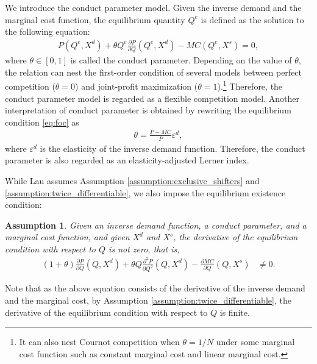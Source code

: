 \documentclass[11pt, a4paper]{article}
\newtheorem{assumption}{Assumption}
\theoremstyle{remark}
\begin{document}
We introduce the conduct parameter model.
Given the inverse demand and the marginal cost function, the equilibrium quantity $Q^e$ is defined as the solution to the following equation:
\begin{align}
    P(Q^e, X^{d}) + \theta Q^e\frac{\partial P}{\partial Q}(Q^e, X^{d}) - MC(Q^e, X^{s}) = 0, \label{eq:foc}
\end{align}
where $\theta\in [0,1]$ is called the conduct parameter.
Depending on the value of $\theta$, the relation can nest the first-order condition of several models between perfect competition ($\theta=0$) and joint-profit maximization ($\theta=1$).\footnote{It can also nest Cournot competition when $\theta=1/N$ under some marginal cost function such as constant marginal cost and linear marginal cost.}
Therefore, the conduct parameter model is regarded as a flexible competition model.
Another interpretation of conduct parameter is obtained by rewriting the equilibrium condition \eqref{eq:foc} as
\begin{align}
    \theta = \frac{P - MC}{P}\varepsilon^{d},
\end{align}
where $\varepsilon^{d}$ is the elasticity of the inverse demand function.
Therefore, the conduct parameter is also regarded as an elasticity-adjusted Lerner index.

While Lau assumes Assumption \ref{assumption:exclusive_shifters} and \ref{assumption:twice_differentiable}, we also impose the equilibrium existence condition:
\begin{assumption}\label{assumption:unique_equilibrium}
    Given an inverse demand function, a conduct parameter, and a marginal cost function, and given $X^{d}$ and $X^{s}$, the derivative of the equilibrium condition with respect to $Q$ is not zero, that is,
    \begin{align}
        (1+\theta)\frac{\partial P}{\partial Q}(Q, X^{d}) + \theta Q\frac{\partial^2 P}{\partial Q^2}(Q, X^{d}) - \frac{\partial MC}{\partial Q}(Q, X^{s}) & \ne 0.
    \end{align}
\end{assumption}
Note that as the above equation consists of the derivative of the inverse demand and the marginal cost, by Assumption \ref{assumption:twice_differentiable}, the derivative of the equilibrium condition with respect to $Q$ is finite.
\end{document}
